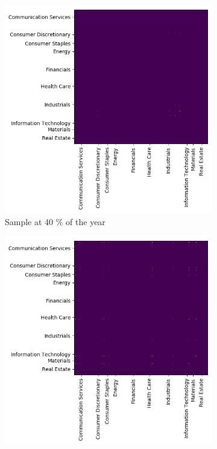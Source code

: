 \documentclass[12pt]{extarticle}
\begin{document}
\begin{figure}[!h]
\begin{subfigure}{0.48\textwidth}
		\includegraphics[width=\textwidth]{adj_100.png}
		\caption{Sample at 40 \% of the year} %
	\end{subfigure}
	\begin{subfigure}{0.48\textwidth} %
		\includegraphics[width=\textwidth]{adj_150.png}

\end{subfigure}
\end{figure}
\end{document}
